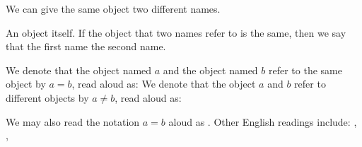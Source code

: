
\sbasic


\sstart
{}


We can give the
same object two different
names.


An object
 itself.
If the object that two
names refer to is
the same,
then we say
that the first name
the second name.


We denote that
the object named $a$ and
the object named $b$ refer
to the same object
by $a = b$,
read aloud as:
We denote that
the object $a$ and
$b$ refer to different
objects by $a \neq b$,
read aloud as:

We may also read the notation
$a = b$ aloud as .
Other English readings
include: ,
,
\strats
